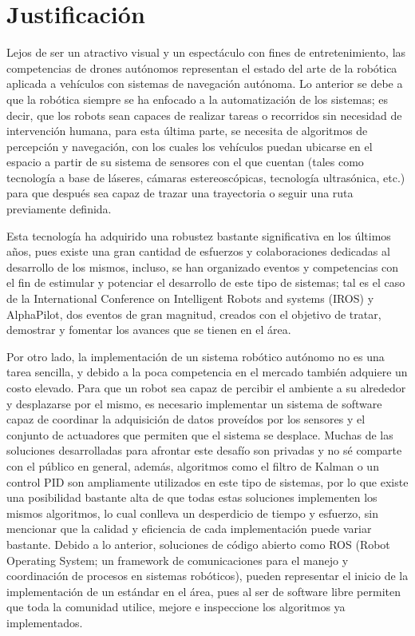 \section{Justificación}
Lejos de ser un atractivo visual y un espectáculo con fines de entretenimiento, las competencias de drones autónomos representan el estado del arte de la robótica aplicada a vehículos con sistemas de navegación autónoma.
Lo anterior se debe a que la robótica siempre se ha enfocado a la automatización de los sistemas; es decir, que los robots sean capaces de realizar tareas o recorridos sin necesidad de intervención humana, para esta última parte, se necesita de algoritmos de percepción y navegación, con los cuales los vehículos puedan ubicarse en el espacio a partir de su sistema de sensores con el que cuentan (tales como tecnología a base de láseres, cámaras estereoscópicas, tecnología ultrasónica, etc.) para que después sea capaz de trazar una trayectoria o seguir una ruta previamente definida.   

Esta tecnología ha adquirido una robustez bastante significativa en los últimos años, pues existe una gran cantidad de esfuerzos y colaboraciones dedicadas al desarrollo de los mismos, incluso, se han organizado eventos y competencias con el fin de estimular y potenciar el desarrollo de este tipo de sistemas; tal es el caso de la International Conference on Intelligent Robots and systems (IROS) y AlphaPilot, dos eventos de gran magnitud, creados con el objetivo de tratar, demostrar y fomentar los avances que se tienen en el área.

Por otro lado, la implementación de un sistema robótico autónomo no es una tarea sencilla, y debido a la poca competencia en el mercado también adquiere un costo elevado. 
Para que un robot sea capaz de percibir el ambiente a su alrededor y desplazarse por el mismo, es necesario implementar un sistema de software capaz de coordinar la adquisición de datos proveídos por los sensores y el conjunto de actuadores que permiten que el sistema se desplace. Muchas de las soluciones desarrolladas para afrontar este desafío son privadas y no sé comparte con el público en general, además, algoritmos como el filtro de Kalman o un control PID son ampliamente utilizados en este tipo de sistemas, por lo que existe una posibilidad bastante alta de que todas estas soluciones implementen los mismos algoritmos, lo cual conlleva un desperdicio de tiempo y esfuerzo, sin mencionar que la calidad y eficiencia de cada implementación puede variar bastante.
Debido a lo anterior, soluciones de código abierto como ROS (Robot Operating System; un framework de comunicaciones para el manejo y coordinación de procesos en sistemas robóticos), pueden representar el inicio de la implementación de un estándar en el área, pues al ser de software libre permiten que toda la comunidad utilice, mejore e inspeccione los algoritmos ya implementados.

